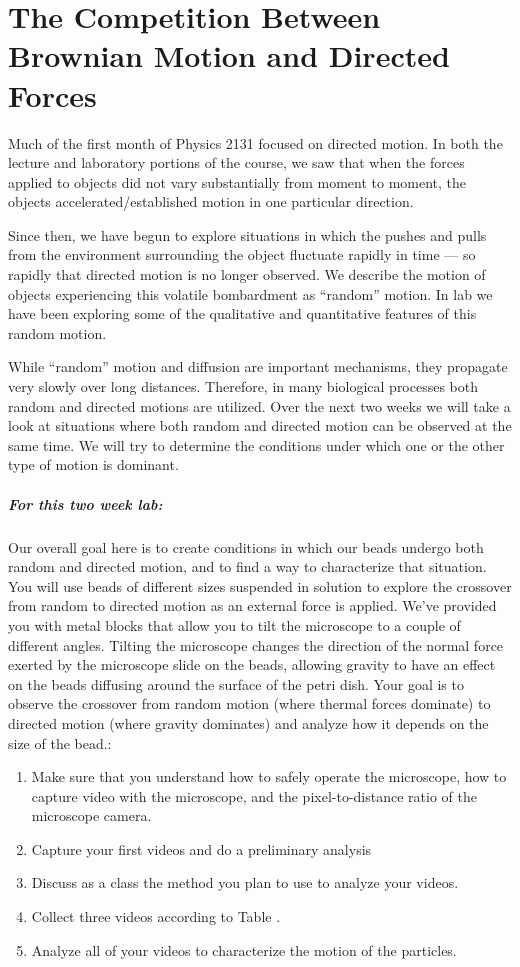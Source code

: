 \chapter{The Competition Between Brownian Motion and Directed Forces}
\thispagestyle{fancy}

Much of the first month of Physics 2131 focused on directed motion.
In both the lecture and laboratory portions of the course, we saw that when the forces applied to objects did not vary substantially from moment to moment, the objects accelerated/established motion in one particular direction.
\par
Since then, we have begun to explore situations in which the pushes and pulls from the environment surrounding the object fluctuate rapidly in time — so rapidly that directed motion is no longer observed. 
We describe the motion of objects experiencing this volatile bombardment as ``random'' motion. 
In lab we have been exploring some of the qualitative and quantitative features of this random motion.
\par
While ``random'' motion and diffusion are important mechanisms, they propagate very slowly over long distances. 
Therefore, in many biological processes both random and directed motions are utilized. 
Over the next two weeks we will take a look at situations where both random and directed motion can be observed at the same time. 
We will try to determine the conditions under which one or the other type of motion is dominant.

\paragraph{For this two week lab:} Our overall goal here is to create conditions in which our beads undergo both random and directed motion, and to find a way to characterize that situation. 
You will use beads of different sizes suspended in solution to explore the crossover from random to directed motion as an external force is applied.
We've provided you with metal blocks that allow you to tilt the microscope to a couple of different angles.
Tilting the microscope changes the direction of the normal force exerted by the microscope slide on the beads, allowing gravity to have an effect on the beads diffusing around the surface of the petri dish.
Your goal is to observe the crossover from random motion (where thermal forces dominate) to directed motion (where gravity dominates) and analyze how it depends on the size of the bead.:
\begin{enumerate}
\item Make sure that you understand how to safely operate the microscope, how to capture video with the microscope, and the pixel-to-distance ratio of the microscope camera.
\item Capture your first videos and do a preliminary analysis
\item Discuss as a class the method you plan to use to analyze your videos.
\item Collect three videos according to Table .
\item Analyze all of your videos to characterize the motion of the particles.
\end{enumerate}

